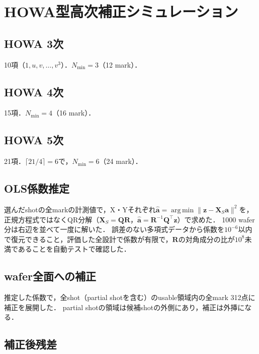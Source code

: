 \documentclass[10.5pt,a4paper]{ltjsarticle}
\DeclareMathOperator*{\argmin}{arg\,min}
\begin{document}
\section{HOWA型高次補正シミュレーション}

\subsection{HOWA 3次}

10項（$1,u,v,\dots,v^3$）．$N_\text{min}=3$（12 mark）．

\subsection{HOWA 4次}

15項．$N_\text{min}=4$（16 mark）．

\subsection{HOWA 5次}

21項．$\lceil21/4\rceil=6$で，$N_\text{min}=6$（24 mark）．

\subsection{OLS係数推定}

選んだshotの全markの計測値で，X・Yそれぞれ$\hat{\bm{a}}=\argmin\|\bm{z}-\bm{X}_S\bm{a}\|^2$を，正規方程式ではなくQR分解（$\bm{X}_S=\bm{Q}\bm{R}$，$\hat{\bm{a}}=\bm{R}^{-1}\bm{Q}^\top\bm{z}$）で求めた．
1000 wafer分は右辺を並べて一度に解いた．
誤差のない多項式データから係数を$10^{-6}$以内で復元できること，評価した全設計で係数が有限で，$\bm{R}$の対角成分の比が$10^{8}$未満であることを自動テストで確認した．

\subsection{wafer全面への補正}

推定した係数で，全shot（partial shotを含む）のusable領域内の全mark 312点に補正を展開した．
partial shotの領域は候補shotの外側にあり，補正は外挿になる．

\subsection{補正後残差}
\end{document}
